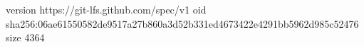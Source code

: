 version https://git-lfs.github.com/spec/v1
oid sha256:06ae61550582de9517a27b860a3d52b331ed4673422e4291bb5962d985c52476
size 4364
